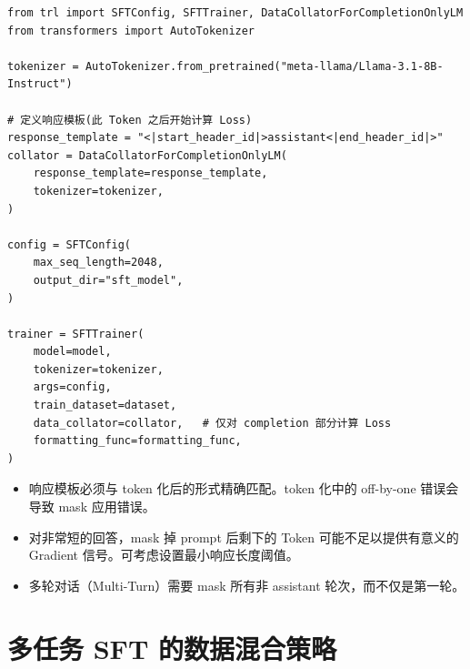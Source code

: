 \begin{examplebox}
\begin{lstlisting}[style=pythonstyle]
from trl import SFTConfig, SFTTrainer, DataCollatorForCompletionOnlyLM
from transformers import AutoTokenizer

tokenizer = AutoTokenizer.from_pretrained("meta-llama/Llama-3.1-8B-Instruct")

# 定义响应模板(此 Token 之后开始计算 Loss)
response_template = "<|start_header_id|>assistant<|end_header_id|>"
collator = DataCollatorForCompletionOnlyLM(
    response_template=response_template,
    tokenizer=tokenizer,
)

config = SFTConfig(
    max_seq_length=2048,
    output_dir="sft_model",
)

trainer = SFTTrainer(
    model=model,
    tokenizer=tokenizer,
    args=config,
    train_dataset=dataset,
    data_collator=collator,   # 仅对 completion 部分计算 Loss
    formatting_func=formatting_func,
)
\end{lstlisting}
\end{examplebox}

\begin{warningbox}
\begin{itemize}
  \item 响应模板必须与 token 化后的形式精确匹配。token 化中的 off-by-one 错误会导致 mask 应用错误。
  \item 对非常短的回答，mask 掉 prompt 后剩下的 Token 可能不足以提供有意义的 Gradient 信号。可考虑设置最小响应长度阈值。
  \item 多轮对话（Multi-Turn）需要 mask 所有非 assistant 轮次，而不仅是第一轮。
\end{itemize}
\end{warningbox}

\section{多任务 SFT 的数据混合策略}
\label{sec:data-mixing}

